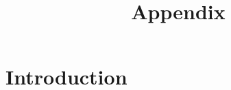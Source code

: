 \documentclass[sigplan,screen]{acmart}
\begin{document}
\title{Appendix}




 


\maketitle

\section{Introduction}
\end{document}
